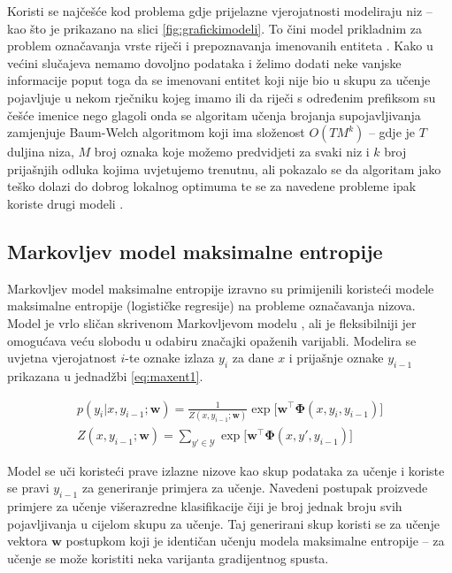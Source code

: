 Koristi se najčešće kod problema gdje prijelazne vjerojatnosti modeliraju niz --
kao što je prikazano na slici \ref{fig:grafickimodeli}. To čini model prikladnim
za problem označavanja vrste riječi \citep{halacsy2007hunpos} i prepoznavanja
imenovanih entiteta \citep{zhou2002named}. Kako u većini slučajeva nemamo
dovoljno podataka i želimo dodati neke vanjske informacije poput toga da se
imenovani entitet koji nije bio u skupu za učenje pojavljuje u nekom rječniku
kojeg imamo ili da riječi s određenim prefiksom su češće imenice nego glagoli
onda se algoritam učenja brojanja supojavljivanja zamjenjuje Baum-Welch
algoritmom koji ima složenost $O(T M ^ k)$ -- gdje je $T$ duljina niza, $M$ broj
oznaka koje možemo predvidjeti za svaki niz i $k$ broj prijašnjih odluka kojima
uvjetujemo trenutnu, ali pokazalo se da algoritam jako teško dolazi do dobrog
lokalnog optimuma te se za navedene probleme ipak koriste drugi modeli
\citep{johnson2007doesn}.

\subsection{Markovljev model maksimalne entropije}

Markovljev model maksimalne entropije 
izravno su primijenili \citet*{mccallum2000maximum} koristeći modele maksimalne
entropije (logističke regresije) na probleme označavanja nizova. Model je vrlo
sličan skrivenom Markovljevom modelu , ali je
fleksibilniji jer omogućava veću slobodu u odabiru značajki opaženih varijabli.
Modelira se uvjetna vjerojatnost $i$-te oznake izlaza $y_i$ za dane $x$ i
prijašnje oznake $y_{i-1}$ prikazana u jednadžbi \ref{eq:maxent1}.

\begin{equation}\label{eq:maxent1}
\begin{aligned}
  p(y_i | x, y_{i-1}; \mathbf{w}) = \frac{1}{Z(x, y_{i-1}; \mathbf{w})} \exp \big[ \mathbf{w}^\top \mathbf{\Phi}(x, y_i, y_{i-1})\big] \\
  Z(x, y_{i-1}; \mathbf{w}) = \sum_{y' \in \mathcal{Y}} \exp \big[ \mathbf{w}^\top \mathbf{\Phi}(x, y', y_{i-1})\big]
\end{aligned}
\end{equation}

\noindent
Model se uči koristeći prave izlazne nizove kao skup podataka za učenje i
koriste se pravi $y_{i-1}$ za generiranje primjera za učenje. Navedeni postupak
proizvede primjere za učenje višerazredne klasifikacije čiji je broj jednak
broju svih pojavljivanja u cijelom skupu za učenje. Taj generirani skup koristi
se za učenje vektora $\mathbf{w}$ postupkom koji je identičan učenju modela
maksimalne entropije -- za učenje se može koristiti neka varijanta gradijentnog
spusta.

